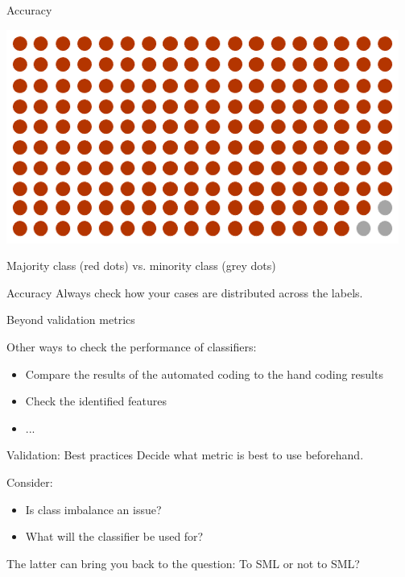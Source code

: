 \documentclass[compress]{beamer}
\begin{document}
\begin{frame}{Accuracy}
	
\begin{center}
	\includegraphics[width=\linewidth,height=\textheight,keepaspectratio]{../pictures/imbalance.png} 
\end{center}	

Majority class (red dots) vs. minority class (grey dots) 
\end{frame}

\begin{frame}{Accuracy}
Always check how your cases are distributed across the labels.
\end{frame}


\begin{frame}{Beyond validation metrics}

\begin{alertblock}{Other ways to check the performance of classifiers:}
\begin{itemize}
	\item Compare the results of the automated coding to the hand coding results
	\item Check the identified features
	\item ...
\end{itemize}
\end{alertblock}
\end{frame}


\begin{frame}{Validation: Best practices}
Decide what metric is best to use beforehand.

\begin{alertblock}{Consider:}
	\begin{itemize}
		\item Is class imbalance an issue? 
		\item What will the classifier be used for?
	\end{itemize}
\end{alertblock}

The latter can bring you back to the question: To SML or not to SML?
\end{frame}
\end{document}
